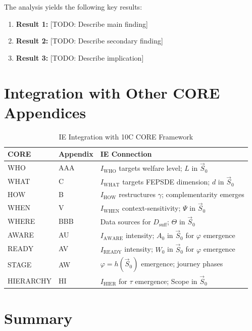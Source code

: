 The analysis yields the following key results:

\begin{enumerate}
    \item \textbf{Result 1:} [TODO: Describe main finding]
    \item \textbf{Result 2:} [TODO: Describe secondary finding]
    \item \textbf{Result 3:} [TODO: Describe implication]
\end{enumerate}

\section{Integration with Other CORE Appendices}
\label{sec:ie-integration}

\begin{table}[htbp]
\centering
\caption{IE Integration with 10C CORE Framework}
\label{tab:ie-9c-integration}
\renewcommand{\arraystretch}{1.3}
\begin{tabular}{@{}llp{6cm}@{}}
\toprule
\textbf{CORE} & \textbf{Appendix} & \textbf{IE Connection} \\
\midrule
WHO & AAA & $I_{\text{WHO}}$ targets welfare level; $L$ in $\vec{S}_0$ \\
WHAT & C & $I_{\text{WHAT}}$ targets FEPSDE dimension; $d$ in $\vec{S}_0$ \\
HOW & B & $I_{\text{HOW}}$ restructures $\gamma$; complementarity emerges \\
WHEN & V & $I_{\text{WHEN}}$ context-sensitivity; $\Psi$ in $\vec{S}_0$ \\
WHERE & BBB & Data sources for $D_{\text{suff}}$; $\Theta$ in $\vec{S}_0$ \\
AWARE & AU & $I_{\text{AWARE}}$ intensity; $A_0$ in $\vec{S}_0$ for $\varphi$ emergence \\
READY & AV & $I_{\text{READY}}$ intensity; $W_0$ in $\vec{S}_0$ for $\varphi$ emergence \\
STAGE & AW & $\varphi = h(\vec{S}_0)$ emergence; journey phases \\
HIERARCHY & HI & $I_{\text{HIER}}$ for $\tau$ emergence; Scope in $\vec{S}_0$ \\
\bottomrule
\end{tabular}
\end{table}


\section{Summary}
\label{sec:ie-summary}

